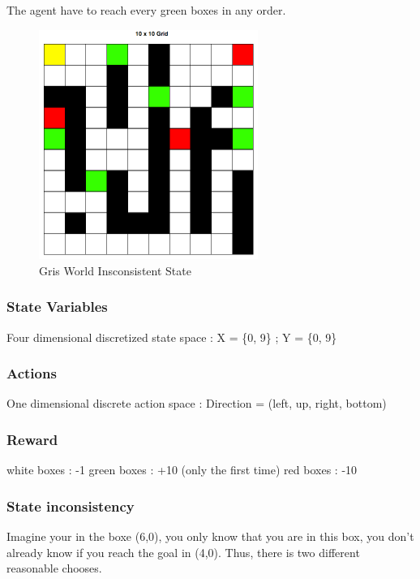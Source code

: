 \documentclass[a4paper,12pt]{article}
\begin{document}
    The agent have to reach every green boxes in any order.

    \begin{figure}[H]
      \begin{center}
	\includegraphics[width=270px]{gridworldls}
	\caption{ Gris World Insconsistent State }
	\end{center}
    \end{figure}
    
    \subsubsection{State Variables}
    Four dimensional discretized state space : X = \{0, 9\} ; Y = \{0, 9\}
    
    \subsubsection{Actions}
     One dimensional discrete action space : Direction = (left, up, right, bottom)
     
     \subsubsection{Reward}
      white boxes : -1 \newline
      green boxes : +10 (only the first time)\newline
      red boxes : -10 \newline
      
      \subsubsection{State inconsistency}
      
      Imagine your in the boxe (6,0), you only know that you are in this box, you don't already know 
      if you reach the goal in (4,0). Thus, there is two different reasonable chooses.
\end{document}
